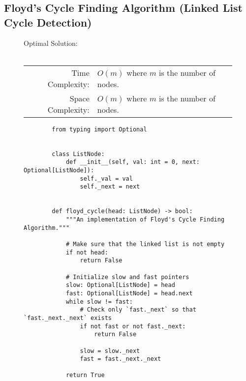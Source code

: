 
\subsection{Floyd's Cycle Finding Algorithm (Linked List Cycle Detection)}

\begin{figure}[H]
    Optimal Solution:\\\\
    \begin{tabular}{rl}
        Time Complexity:& \(O(m)\) where \(m\) is the number of nodes.\\
        Space Complexity:& \(O(m)\) where \(m\) is the number of nodes.
    \end{tabular}
\end{figure}

\begin{figure}[H]
    \centering
    \begin{verbatim}
        from typing import Optional


        class ListNode:
            def __init__(self, val: int = 0, next: Optional[ListNode]):
                self._val = val
                self._next = next


        def floyd_cycle(head: ListNode) -> bool:
            """An implementation of Floyd's Cycle Finding Algorithm."""

            # Make sure that the linked list is not empty
            if not head:
                return False

            # Initialize slow and fast pointers
            slow: Optional[ListNode] = head
            fast: Optional[ListNode] = head.next
            while slow != fast:
                # Check only `fast._next` so that `fast._next._next` exists
                if not fast or not fast._next:
                    return False

                slow = slow._next
                fast = fast._next._next

            return True
    \end{verbatim}
\end{figure}
